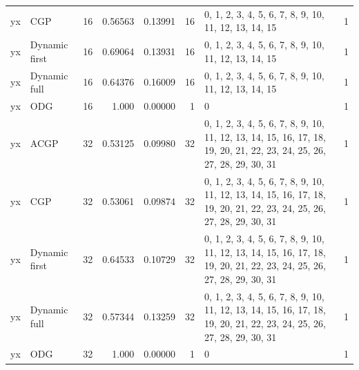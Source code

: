 \documentclass[10pt,a4paper]{article}
\begin{document}
\begin{longtable}{@{}p{23mm}p{29mm}rrrrp{36mm}r@{}}
yx & CGP & 16 & 0.56563 & 0.13991 & 16 & 0, 1, 2, 3, 4, 5, 6, 7, 8, 9, 10, 11, 12, 13, 14, 15 & 1 \\
yx & Dynamic first & 16 & 0.69064 & 0.13931 & 16 & 0, 1, 2, 3, 4, 5, 6, 7, 8, 9, 10, 11, 12, 13, 14, 15 & 1 \\
yx & Dynamic full & 16 & 0.64376 & 0.16009 & 16 & 0, 1, 2, 3, 4, 5, 6, 7, 8, 9, 10, 11, 12, 13, 14, 15 & 1 \\
yx & ODG & 16 & 1.000 & 0.00000 & 1 & 0 & 1 \\
yx & ACGP & 32 & 0.53125 & 0.09980 & 32 & 0, 1, 2, 3, 4, 5, 6, 7, 8, 9, 10, 11, 12, 13, 14, 15, 16, 17, 18, 19, 20, 21, 22, 23, 24, 25, 26, 27, 28, 29, 30, 31 & 1 \\
yx & CGP & 32 & 0.53061 & 0.09874 & 32 & 0, 1, 2, 3, 4, 5, 6, 7, 8, 9, 10, 11, 12, 13, 14, 15, 16, 17, 18, 19, 20, 21, 22, 23, 24, 25, 26, 27, 28, 29, 30, 31 & 1 \\
yx & Dynamic first & 32 & 0.64533 & 0.10729 & 32 & 0, 1, 2, 3, 4, 5, 6, 7, 8, 9, 10, 11, 12, 13, 14, 15, 16, 17, 18, 19, 20, 21, 22, 23, 24, 25, 26, 27, 28, 29, 30, 31 & 1 \\
yx & Dynamic full & 32 & 0.57344 & 0.13259 & 32 & 0, 1, 2, 3, 4, 5, 6, 7, 8, 9, 10, 11, 12, 13, 14, 15, 16, 17, 18, 19, 20, 21, 22, 23, 24, 25, 26, 27, 28, 29, 30, 31 & 1 \\
yx & ODG & 32 & 1.000 & 0.00000 & 1 & 0 & 1 \\
\end{longtable}\normalsize\setlength{\tabcolsep}{6pt}
\clearpage
\end{document}
